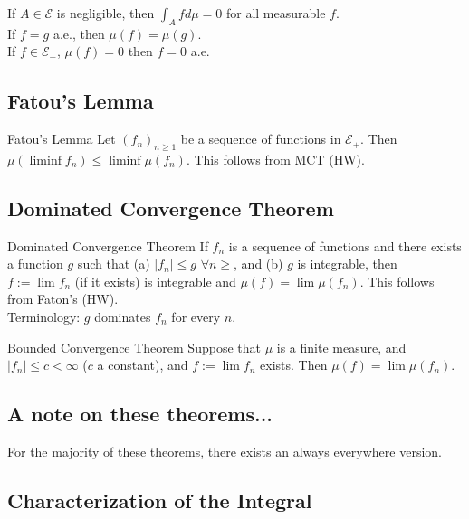 \documentclass[english, course]{Notes}
\begin{document}
\begin{lemma}
If $A \in \mathcal{E}$ is negligible, then $\int_A f d\mu = 0$ for all measurable $f$.\\

If $f = g$ a.e., then $\mu(f) = \mu(g)$.\\

If $f \in \mathcal{E}_+$, $\mu(f) = 0$ then $f = 0$ a.e.
\end{lemma}

\subsection{Fatou's Lemma}
\begin{theorem}{Fatou's Lemma}
Let $(f_n)_{n \geq 1}$ be a sequence of functions in $\mathcal{E}_+$. Then $\mu(\liminf f_n) \leq \liminf \mu(f_n)$. This follows from MCT (HW).
\end{theorem}

\subsection{Dominated Convergence Theorem}

\begin{theorem}{Dominated Convergence Theorem}
If $f_n$ is a sequence of functions and there exists a function $g$ such that (a) $|f_n| \leq g$ $\forall n \geq $, and (b) $g$ is integrable, then $f:= \lim f_n$ (if it exists) is integrable and $\mu(f) = \lim \mu(f_n)$. This follows from Faton's (HW).\\

Terminology: $g$ dominates $f_n$ for every $n$.
\end{theorem}

\begin{corollary}{Bounded Convergence Theorem}
Suppose that $\mu$ is a finite measure, and $|f_n| \leq c < \infty$ ($c$ a constant), and $f:= \lim f_n$ exists. Then $\mu(f) = \lim \mu(f_n)$.
\end{corollary}

\subsection{A note on these theorems...}
For the majority of these theorems, there exists an always everywhere version.\\

\subsection{Characterization of the Integral}
\end{document}

